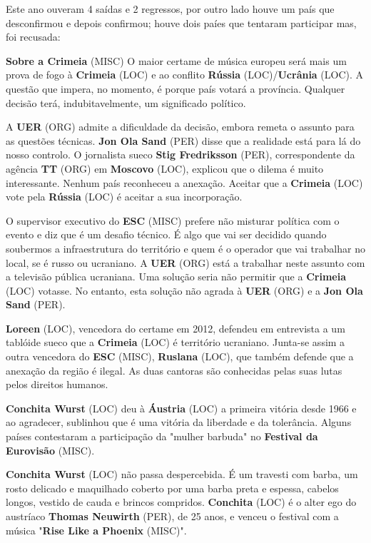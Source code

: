 \documentclass[12pt,a4paper]{article}
\begin{document}
Este ano ouveram 4 saídas e 2 regressos, por outro lado houve um país que desconfirmou e depois confirmou; houve dois paíes que tentaram participar mas, foi recusada:

\textbf{Sobre a Crimeia} (MISC) O maior certame de música europeu será mais um prova de fogo à \textbf{Crimeia} (LOC) e ao conflito \textbf{Rússia} (LOC)/\textbf{Ucrânia} (LOC). A questão que impera, no momento, é porque país votará a província. Qualquer decisão terá, indubitavelmente, um significado político.

A \textbf{UER} (ORG) admite a dificuldade da decisão, embora remeta o assunto para as questões técnicas. \textbf{Jon Ola Sand} (PER) disse que a realidade está para lá do nosso controlo. O jornalista sueco \textbf{Stig Fredriksson} (PER), correspondente da agência \textbf{TT} (ORG) em \textbf{Moscovo} (LOC), explicou que o dilema é muito interessante. Nenhum país reconheceu a anexação. Aceitar que a \textbf{Crimeia} (LOC) vote pela \textbf{Rússia} (LOC) é aceitar a sua incorporação.

O supervisor executivo do \textbf{ESC} (MISC) prefere não misturar política com o evento e diz que é um desafio técnico. É algo que vai ser decidido quando soubermos a infraestrutura do território e quem é o operador que vai trabalhar no local, se é russo ou ucraniano. A \textbf{UER} (ORG) está a trabalhar neste assunto com a televisão pública ucraniana. Uma solução seria não permitir que a \textbf{Crimeia} (LOC) votasse. No entanto, esta solução não agrada à \textbf{UER} (ORG) e a \textbf{Jon Ola Sand} (PER).

\textbf{Loreen} (LOC), vencedora do certame em 2012, defendeu em entrevista a um tablóide sueco que a \textbf{Crimeia} (LOC) é território ucraniano. Junta-se assim a outra vencedora do \textbf{ESC} (MISC), \textbf{Ruslana} (LOC), que também defende que a anexação da região é ilegal. As duas cantoras são conhecidas pelas suas lutas pelos direitos humanos.

\textbf{Conchita Wurst} (LOC) deu à \textbf{Áustria} (LOC) a primeira vitória desde 1966 e ao agradecer, sublinhou que é uma vitória da liberdade e da tolerância. Alguns países contestaram a participação da "mulher barbuda" no \textbf{Festival da Eurovisão} (MISC).

\textbf{Conchita Wurst} (LOC) não passa despercebida. É um travesti com barba, um rosto delicado e maquilhado coberto por uma barba preta e espessa, cabelos longos, vestido de cauda e brincos compridos. \textbf{Conchita} (LOC) é o alter ego do austríaco \textbf{Thomas Neuwirth} (PER), de 25 anos, e venceu o festival com a música "\textbf{Rise Like a Phoenix} (MISC)".
\end{document}
